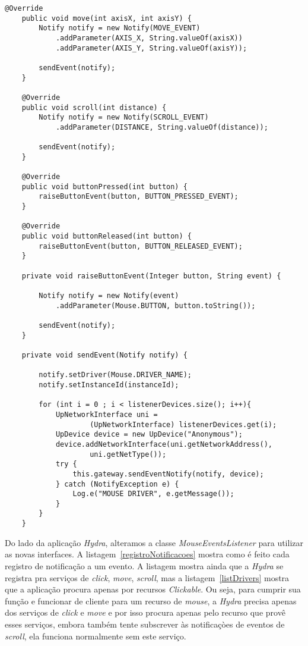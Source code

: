 \begin{lstlisting}[frame=single]
	@Override
	public void move(int axisX, int axisY) {
		Notify notify = new Notify(MOVE_EVENT)
			.addParameter(AXIS_X, String.valueOf(axisX))
			.addParameter(AXIS_Y, String.valueOf(axisY));
		
        sendEvent(notify);
	}
    
	@Override
	public void scroll(int distance) {
		Notify notify = new Notify(SCROLL_EVENT)
			.addParameter(DISTANCE, String.valueOf(distance));
	
	    sendEvent(notify);	
	}

	@Override
	public void buttonPressed(int button) {
		raiseButtonEvent(button, BUTTON_PRESSED_EVENT);
	}

	@Override
	public void buttonReleased(int button) {
		raiseButtonEvent(button, BUTTON_RELEASED_EVENT);
	}

	private void raiseButtonEvent(Integer button, String event) {
		
		Notify notify = new Notify(event)
			.addParameter(Mouse.BUTTON, button.toString());

        sendEvent(notify);
	}

	private void sendEvent(Notify notify) {
		
		notify.setDriver(Mouse.DRIVER_NAME);
	    notify.setInstanceId(instanceId);
		
		for (int i = 0 ; i < listenerDevices.size(); i++){
	        UpNetworkInterface uni = 
	        		(UpNetworkInterface) listenerDevices.get(i);
	        UpDevice device = new UpDevice("Anonymous");
	        device.addNetworkInterface(uni.getNetworkAddress(), 
	        		uni.getNetType());
	        try {
	            this.gateway.sendEventNotify(notify, device);
	        } catch (NotifyException e) {
	        	Log.e("MOUSE DRIVER", e.getMessage());
	        }
	    }
	}
\end{lstlisting}

Do lado da aplicação \emph{Hydra}, alteramos a classe \emph{MouseEventsListener} para utilizar as novas interfaces. A listagem~\ref{registroNotificacoes} mostra como é feito cada registro de notificação a um evento. A listagem mostra ainda que a \emph{Hydra} se registra pra serviços de \emph{click}, \emph{move}, \emph{scroll}, mas a listagem~\ref{listDrivers} mostra que a aplicação procura apenas por recursos \emph{Clickable}. Ou seja, para cumprir sua função e funcionar de cliente para um recurso de \emph{mouse}, a \emph{Hydra} precisa apenas dos serviços de \emph{click} e \emph{move} e por isso procura apenas pelo recurso que provê esses serviços, embora também tente subscrever às notificaçòes de eventos de \emph{scroll}, ela funciona normalmente sem este serviço.
 

